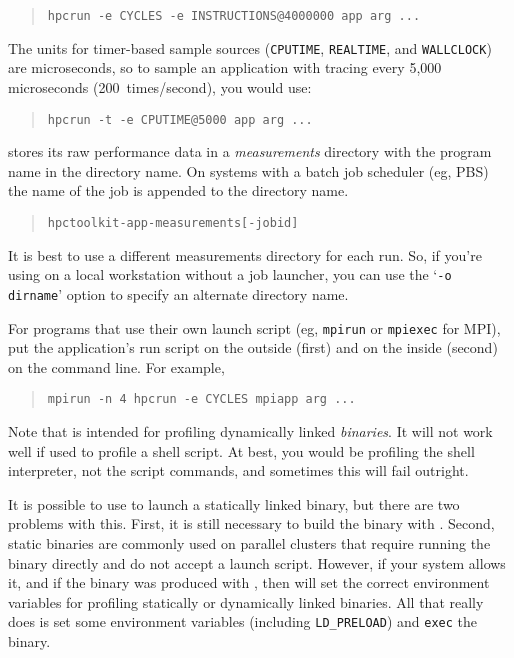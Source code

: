 \begin{quote}
\begin{verbatim}
hpcrun -e CYCLES -e INSTRUCTIONS@4000000 app arg ...
\end{verbatim}
\end{quote}

The units for timer-based sample sources (\verb|CPUTIME|, \verb|REALTIME|, and \verb|WALLCLOCK|) are microseconds,
so to sample an application with tracing every 5,000 microseconds
(200~times/second), you would use:

\begin{quote}
\begin{verbatim}
hpcrun -t -e CPUTIME@5000 app arg ...
\end{verbatim}
\end{quote}

\hpcrun{} stores its raw performance data in a {\it measurements}
directory with the program name in the directory name.  On systems
with a batch job scheduler (eg, PBS) the name of the job is appended
to the directory name.

\begin{quote}
\begin{verbatim}
hpctoolkit-app-measurements[-jobid]
\end{verbatim}
\end{quote}

It is best to use a different measurements directory for each run.
So, if you're using \hpcrun{} on a local workstation without a job
launcher, you can use the `\verb|-o dirname|' option to specify an
alternate directory name.

For programs that use their own launch script (eg, \verb|mpirun| or
\verb|mpiexec| for MPI), put the application's run script on the
outside (first) and \hpcrun{} on the inside (second) on the command
line.  For example,

\begin{quote}
\begin{verbatim}
mpirun -n 4 hpcrun -e CYCLES mpiapp arg ...
\end{verbatim}
\end{quote}

Note that \hpcrun{} is intended for profiling dynamically linked {\it
binaries}.  It will not work well if used to profile a shell script.
At best, you would be profiling the shell interpreter, not the script
commands, and sometimes this will fail outright.

It is possible to use \hpcrun{} to launch a statically linked binary,
but there are two problems with this.  First, it is still necessary to
build the binary with \hpclink{}.  Second, static binaries are
commonly used on parallel clusters that require running the binary
directly and do not accept a launch script.  However, if your system
allows it, and if the binary was produced with \hpclink, then
\hpcrun{} will set the correct environment variables for profiling
statically or dynamically linked binaries.  All that \hpcrun{} really
does is set some environment variables (including \verb|LD_PRELOAD|)
and \verb|exec| the binary.

